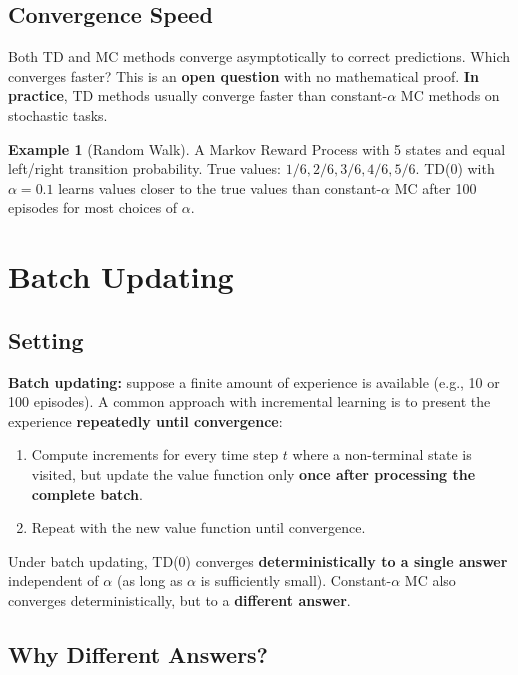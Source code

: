 \documentclass[11pt,a4paper]{article}
\theoremstyle{definition}
\newtheorem{example}{Example}[section]
\theoremstyle{plain}
\theoremstyle{remark}
\begin{document}
\subsection{Convergence Speed}

Both TD and MC methods converge asymptotically to correct predictions. Which converges faster? This is an \textbf{open question} with no mathematical proof. \textbf{In practice}, TD methods usually converge faster than constant-$\alpha$ MC methods on stochastic tasks.

\begin{example}[Random Walk]
A Markov Reward Process with 5 states and equal left/right transition probability. True values: $1/6, 2/6, 3/6, 4/6, 5/6$. TD(0) with $\alpha = 0.1$ learns values closer to the true values than constant-$\alpha$ MC after 100 episodes for most choices of $\alpha$.
\end{example}

\section{Batch Updating}

\subsection{Setting}

\textbf{Batch updating:} suppose a finite amount of experience is available (e.g., 10 or 100 episodes). A common approach with incremental learning is to present the experience \textbf{repeatedly until convergence}:
\begin{enumerate}
    \item Compute increments for every time step $t$ where a non-terminal state is visited, but update the value function only \textbf{once after processing the complete batch}.
    \item Repeat with the new value function until convergence.
\end{enumerate}

Under batch updating, TD(0) converges \textbf{deterministically to a single answer} independent of $\alpha$ (as long as $\alpha$ is sufficiently small). Constant-$\alpha$ MC also converges deterministically, but to a \textbf{different answer}.

\subsection{Why Different Answers?}
\end{document}
